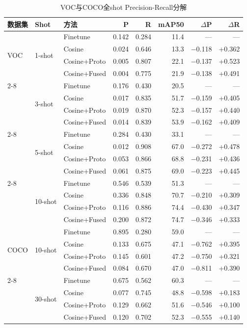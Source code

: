 \documentclass[zihao=5,a4paper,twocolumn]{ctexart}
\begin{document}
\begin{table}[t]
\centering
\caption{VOC与COCO全shot Precision-Recall分解}
\label{tab:pr_full}
\footnotesize
\begin{tabular}{lllrrrrr}
\toprule
数据集 & Shot & 方法 & P & R & mAP50 & $\Delta$P & $\Delta$R \\
\midrule
\multirow{4}{*}{VOC}
& \multirow{4}{*}{1-shot}
& Finetune      & 0.142 & 0.284 & 11.4 & — & — \\
&& Cosine        & 0.024 & 0.646 & 13.3 & $-$0.118 & +0.362 \\
&& Cosine+Proto  & 0.005 & 0.807 & 22.1 & $-$0.137 & +0.523 \\
&& Cosine+Fused  & 0.004 & 0.775 & 21.9 & $-$0.138 & +0.491 \\
\cmidrule{2-8}
& \multirow{4}{*}{3-shot}
& Finetune      & 0.176 & 0.430 & 20.5 & — & — \\
&& Cosine        & 0.017 & 0.835 & 51.7 & $-$0.159 & +0.405 \\
&& Cosine+Proto  & 0.019 & 0.870 & 52.3 & $-$0.157 & +0.440 \\
&& Cosine+Fused  & 0.014 & 0.839 & 53.9 & $-$0.162 & +0.409 \\
\cmidrule{2-8}
& \multirow{4}{*}{5-shot}
& Finetune      & 0.284 & 0.430 & 33.1 & — & — \\
&& Cosine        & 0.012 & 0.908 & 67.0 & $-$0.272 & +0.478 \\
&& Cosine+Proto  & 0.053 & 0.866 & 68.8 & $-$0.231 & +0.436 \\
&& Cosine+Fused  & 0.061 & 0.875 & 69.0 & $-$0.223 & +0.445 \\
\cmidrule{2-8}
& \multirow{4}{*}{10-shot}
& Finetune      & 0.546 & 0.539 & 51.3 & — & — \\
&& Cosine        & 0.336 & 0.848 & 70.7 & $-$0.210 & +0.309 \\
&& Cosine+Proto  & 0.116 & 0.886 & 74.4 & $-$0.430 & +0.347 \\
&& Cosine+Fused  & 0.200 & 0.872 & 74.7 & $-$0.346 & +0.333 \\
\midrule
\multirow{4}{*}{COCO}
& \multirow{4}{*}{10-shot}
& Finetune      & 0.895 & 0.280 & 59.0 & — & — \\
&& Cosine        & 0.133 & 0.675 & 47.1 & $-$0.762 & +0.395 \\
&& Cosine+Proto  & 0.145 & 0.601 & 47.2 & $-$0.750 & +0.321 \\
&& Cosine+Fused  & 0.084 & 0.670 & 47.0 & $-$0.811 & +0.390 \\
\cmidrule{2-8}
& \multirow{4}{*}{30-shot}
& Finetune      & 0.675 & 0.562 & 60.3 & — & — \\
&& Cosine        & 0.077 & 0.745 & 48.8 & $-$0.598 & +0.183 \\
&& Cosine+Proto  & 0.129 & 0.662 & 51.6 & $-$0.546 & +0.100 \\
&& Cosine+Fused  & 0.120 & 0.702 & 52.3 & $-$0.555 & +0.140 \\
\bottomrule
\end{tabular}
\end{table}
\end{document}
